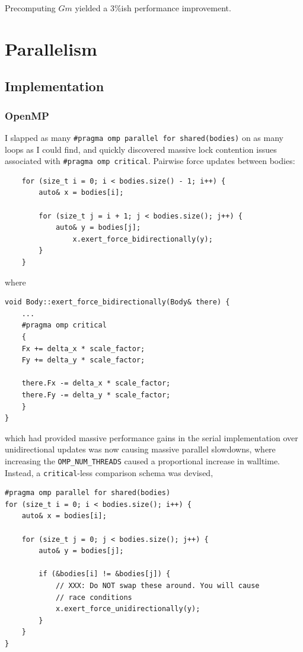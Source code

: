 \documentclass[11pt,a4paper]{article}
\begin{document}
Precomputing $Gm$ yielded a 3\%ish performance improvement.

\section*{Parallelism}
\subsection*{Implementation}
\subsubsection*{OpenMP}

I slapped as many \texttt{\#pragma omp parallel for shared(bodies)} on as many loops as I could find, and quickly discovered massive lock contention issues associated with \texttt{\#pragma omp critical}. Pairwise force updates between bodies:

\begin{verbatim}
    for (size_t i = 0; i < bodies.size() - 1; i++) {
        auto& x = bodies[i];
        
        for (size_t j = i + 1; j < bodies.size(); j++) {
            auto& y = bodies[j];
                x.exert_force_bidirectionally(y);
        }
    }
\end{verbatim}

where 

\begin{verbatim}
void Body::exert_force_bidirectionally(Body& there) {
    ...
    #pragma omp critical
    {
    Fx += delta_x * scale_factor;
    Fy += delta_y * scale_factor;

    there.Fx -= delta_x * scale_factor;
    there.Fy -= delta_y * scale_factor;
    }
}
\end{verbatim}

which had provided massive performance gains in the serial implementation over unidirectional updates was now causing massive parallel slowdowns, where increasing the \texttt{OMP\_NUM\_THREADS} caused a proportional increase in walltime. Instead, a \texttt{critical}-less comparison schema was devised, 

\begin{verbatim}
#pragma omp parallel for shared(bodies)
for (size_t i = 0; i < bodies.size(); i++) {
    auto& x = bodies[i];

    for (size_t j = 0; j < bodies.size(); j++) {
        auto& y = bodies[j];

        if (&bodies[i] != &bodies[j]) {
            // XXX: Do NOT swap these around. You will cause
            // race conditions
            x.exert_force_unidirectionally(y);
        }
    }
}
\end{verbatim}
\end{document}
